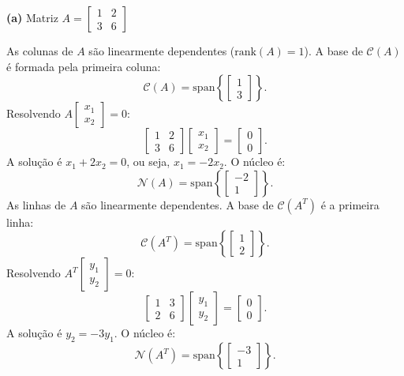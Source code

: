 \begin{resolution}

  {\bf (a)} Matriz \( A = \begin{bmatrix} 1 & 2 \\ 3 & 6 \end{bmatrix} \)

  \vspace{12pt}
  As colunas de \( A \) são linearmente dependentes (\( \text{rank}(A) = 1 \)). A base de \( \mathcal{C}(A) \) é formada pela primeira coluna:
  \[
    \mathcal{C}(A) = \text{span}\left\{ \begin{bmatrix} 1 \\ 3 \end{bmatrix} \right\}.
  \]
  Resolvendo \( A \begin{bmatrix} x_1 \\ x_2 \end{bmatrix} = 0 \):
  \[
    \begin{bmatrix} 1 & 2 \\ 3 & 6 \end{bmatrix} \begin{bmatrix} x_1 \\ x_2 \end{bmatrix} = \begin{bmatrix} 0 \\ 0 \end{bmatrix}.
  \]
  A solução é \( x_1 + 2x_2 = 0 \), ou seja, \( x_1 = -2x_2 \). O núcleo é:
  \[
    \mathcal{N}(A) = \text{span}\left\{ \begin{bmatrix} -2 \\ 1 \end{bmatrix} \right\}.
  \]
  As linhas de \( A \) são linearmente dependentes. A base de \( \mathcal{C}(A^T) \) é a primeira linha:
  \[
    \mathcal{C}(A^T) = \text{span}\left\{ \begin{bmatrix} 1 \\ 2 \end{bmatrix} \right\}.
  \]
  Resolvendo \( A^T \begin{bmatrix} y_1 \\ y_2 \end{bmatrix} = 0 \):
  \[
    \begin{bmatrix} 1 & 3 \\ 2 & 6 \end{bmatrix} \begin{bmatrix} y_1 \\ y_2 \end{bmatrix} = \begin{bmatrix} 0 \\ 0 \end{bmatrix}.
  \]
  A solução é \( y_2 = -3y_1 \). O núcleo é:
  \[
    \mathcal{N}(A^T) = \text{span}\left\{ \begin{bmatrix} -3 \\ 1 \end{bmatrix} \right\}.
  \]


\end{resolution}
